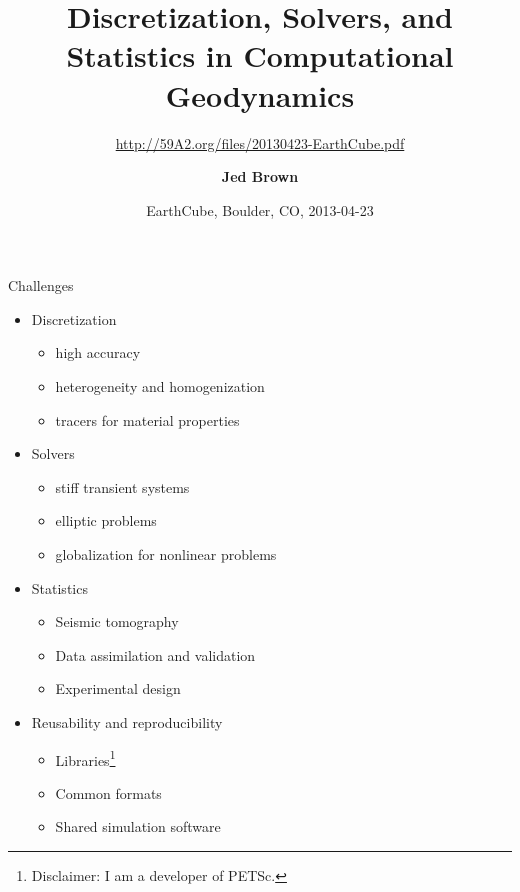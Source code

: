\documentclass{beamer}
\title{Discretization, Solvers, and Statistics in Computational Geodynamics}
\subtitle{{\normalsize \url{http://59A2.org/files/20130423-EarthCube.pdf}}}
\author{{\bf Jed Brown}}
\institute
{
  {Mathematics and Computer Science Division, Argonne National Laboratory}
}
\date{EarthCube, Boulder, CO, 2013-04-23}
\begin{document}
\lstset{language=C}
\normalem

\begin{frame}
  \titlepage
\end{frame}

\begin{frame}{Challenges}
  \begin{itemize}
  \item Discretization
    \begin{itemize}
    \item high accuracy
    \item heterogeneity and homogenization
    \item tracers for material properties
    \end{itemize}
  \item Solvers
    \begin{itemize}
    \item stiff transient systems
    \item elliptic problems
    \item globalization for nonlinear problems
    \end{itemize}
  \item Statistics
    \begin{itemize}
    \item Seismic tomography
    \item Data assimilation and validation
    \item Experimental design
    \end{itemize}
  \item Reusability and reproducibility
    \begin{itemize}
    \item Libraries\footnote{Disclaimer: I am a developer of PETSc.}
    \item Common formats
    \item Shared simulation software
    \end{itemize}
  \end{itemize}
\end{frame}
\end{document}
